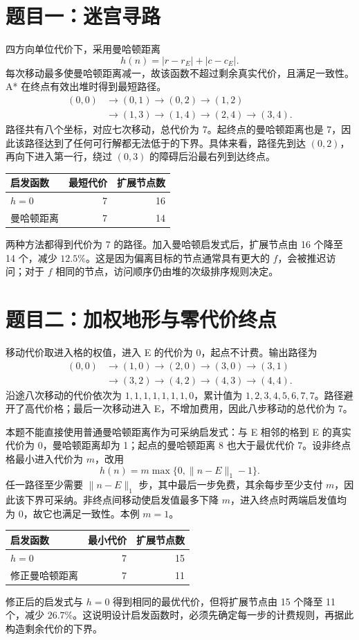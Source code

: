 \documentclass[UTF8,a4paper,zihao=5]{ctexart}
\begin{document}
\section{题目一：迷宫寻路}
四方向单位代价下，采用曼哈顿距离
\[
h(n)=|r-r_E|+|c-c_E|.
\]
每次移动最多使曼哈顿距离减一，故该函数不超过剩余真实代价，且满足一致性。A* 在终点有效出堆时得到最短路径。
\[
\begin{aligned}
(0,0)&\to(0,1)\to(0,2)\to(1,2)\\
&\to(1,3)\to(1,4)\to(2,4)\to(3,4).
\end{aligned}
\]
路径共有八个坐标，对应七次移动，总代价为 7。起终点的曼哈顿距离也是 7，因此该路径达到了任何可行解都无法低于的下界。具体来看，路径先到达 $(0,2)$，再向下进入第一行，绕过 $(0,3)$ 的障碍后沿最右列到达终点。
\begin{center}
\begin{tabular}{lrr}\toprule
启发函数 & 最短代价 & 扩展节点数\\\midrule
$h=0$ &7&16\\
曼哈顿距离 &7&14\\\bottomrule
\end{tabular}
\end{center}
两种方法都得到代价为 7 的路径。加入曼哈顿启发式后，扩展节点由 16 个降至 14 个，减少 $12.5\%$。这是因为偏离目标的节点通常具有更大的 $f$，会被推迟访问；对于 $f$ 相同的节点，访问顺序仍由堆的次级排序规则决定。

\section{题目二：加权地形与零代价终点}
移动代价取进入格的权值，进入 E 的代价为 0，起点不计费。输出路径为
\[
\begin{aligned}
(0,0)&\to(1,0)\to(2,0)\to(3,0)\to(3,1)\\
&\to(3,2)\to(4,2)\to(4,3)\to(4,4).
\end{aligned}
\]
沿途八次移动的代价依次为 $1,1,1,1,1,1,1,0$，累计值为 $1,2,3,4,5,6,7,7$。路径避开了高代价格；最后一次移动进入 E，不增加费用，因此八步移动的总代价为 7。

本题不能直接使用普通曼哈顿距离作为可采纳启发式：与 E 相邻的格到 E 的真实代价为 0，曼哈顿距离却为 1；起点的曼哈顿距离 8 也大于最优代价 7。设非终点格最小进入代价为 $m$，改用
\[
h(n)=m\max\{0,\|n-E\|_1-1\}.
\]
任一路径至少需要 $\|n-E\|_1$ 步，其中最后一步免费，其余每步至少支付 $m$，因此该下界可采纳。非终点间移动使启发值最多下降 $m$，进入终点时两端启发值均为 0，故它也满足一致性。本例 $m=1$。
\begin{center}
\begin{tabular}{lrr}\toprule
启发函数 & 最小代价 & 扩展节点数\\\midrule
$h=0$ &7&15\\
修正曼哈顿距离 &7&11\\\bottomrule
\end{tabular}
\end{center}
修正后的启发式与 $h=0$ 得到相同的最优代价，但将扩展节点由 15 个降至 11 个，减少 $26.7\%$。这说明设计启发函数时，必须先确定每一步的计费规则，再据此构造剩余代价的下界。
\end{document}

